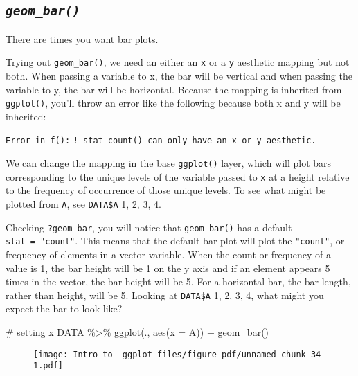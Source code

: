 \documentclass[
  letterpaper,
  DIV=11,
  numbers=noendperiod]{scrartcl}
\newenvironment{Shaded}{\begin{snugshade}}{\end{snugshade}}
\newcommand{\AttributeTok}[1]{\textcolor[rgb]{0.40,0.45,0.13}{#1}}
\newcommand{\CommentTok}[1]{\textcolor[rgb]{0.37,0.37,0.37}{#1}}
\newcommand{\FunctionTok}[1]{\textcolor[rgb]{0.28,0.35,0.67}{#1}}
\newcommand{\NormalTok}[1]{\textcolor[rgb]{0.00,0.23,0.31}{#1}}
\newcommand{\SpecialCharTok}[1]{\textcolor[rgb]{0.37,0.37,0.37}{#1}}
\begin{document}
\hypertarget{geom_bar}{%
\subsection{\texorpdfstring{\emph{\texttt{geom\_bar()}}}{geom\_bar()}}\label{geom_bar}}

There are times you want bar plots.

Trying out \texttt{geom\_bar()}, we need an either an \texttt{x} or a
\texttt{y} aesthetic mapping but not both. When passing a variable to x,
the bar will be vertical and when passing the variable to y, the bar
will be horizontal. Because the mapping is inherited from
\texttt{ggplot()}, you'll throw an error like the following because both
x and y will be inherited:

\texttt{Error\ in\ f():}
\texttt{!\ stat\_count()\ can\ only\ have\ an\ x\ or\ y\ aesthetic.}

We can change the mapping in the base \texttt{ggplot()} layer, which
will plot bars corresponding to the unique levels of the variable passed
to \texttt{x} at a height relative to the frequency of occurrence of
those unique levels. To see what might be plotted from \texttt{A}, see
\texttt{DATA\$A} 1, 2, 3, 4.

Checking \texttt{?geom\_bar}, you will notice that \texttt{geom\_bar()}
has a default \texttt{stat\ =\ "count"}. This means that the default bar
plot will plot the \texttt{"count"}, or frequency of elements in a
vector variable. When the count or frequency of a value is 1, the bar
height will be 1 on the y axis and if an element appears 5 times in the
vector, the bar height will be 5. For a horizontal bar, the bar length,
rather than height, will be 5. Looking at \texttt{DATA\$A} 1, 2, 3, 4,
what might you expect the bar to look like?

\begin{Shaded}
\begin{Highlighting}[]
\CommentTok{\# setting x}
\NormalTok{DATA }\SpecialCharTok{\%\textgreater{}\%}
  \FunctionTok{ggplot}\NormalTok{(., }\FunctionTok{aes}\NormalTok{(}\AttributeTok{x =}\NormalTok{ A)) }\SpecialCharTok{+}
  \FunctionTok{geom\_bar}\NormalTok{()}
\end{Highlighting}
\end{Shaded}

\begin{figure}[H]

{\centering \texttt{[image: Intro\_to\_\_ggplot\_files/figure-pdf/unnamed-chunk-34-1.pdf]}

}

\end{figure}
\end{document}
